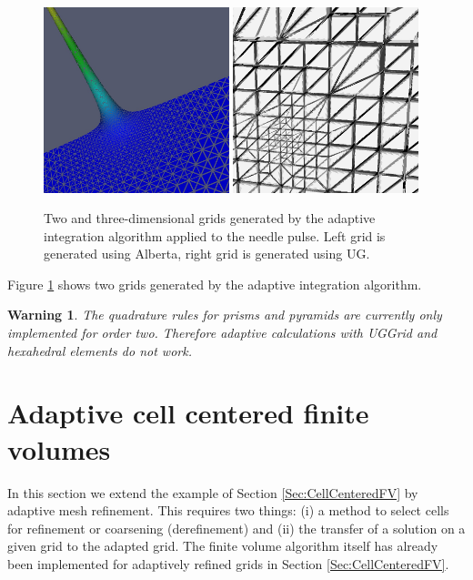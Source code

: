 \documentclass[11pt,a4paper,headinclude,footinclude,DIV16,normalheadings]{scrreprt}
\newtheorem{warn}[exc]{Warning}
\begin{document}
\begin{figure}
\includegraphics[width=0.48\textwidth]{EPS/adaptiveintegration_alberta2d}\hfill
\includegraphics[width=0.48\textwidth]{EPS/adaptiveintegration_ug3d}
\label{Fig:AdaptiveIntegration}
\caption{Two and three-dimensional grids generated by the adaptive
  integration algorithm applied to the needle pulse. Left grid is
  generated using Alberta, right grid is generated using UG.}
\end{figure}

Figure \ref{Fig:AdaptiveIntegration} shows two grids generated by the
adaptive integration algorithm. 

\begin{warn} The quadrature rules for prisms and pyramids are
  currently only implemented for order two. Therefore adaptive
  calculations with UGGrid and hexahedral elements do not work.
\end{warn}



\section{Adaptive cell centered finite volumes}

In this section we extend the example of Section
\ref{Sec:CellCenteredFV} by adaptive mesh refinement. This requires
two things: (i) a method to select cells for refinement or coarsening
(derefinement) and (ii) the transfer of a solution on a given grid to
the adapted grid. The finite volume algorithm itself has already been
implemented for adaptively refined grids in Section
\ref{Sec:CellCenteredFV}.
\end{document}
